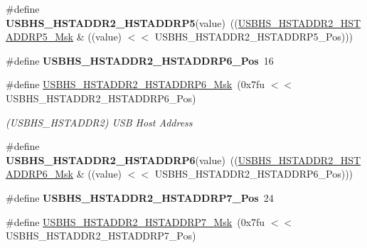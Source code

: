 \begin{DoxyCompactItemize}
\#define {\bfseries U\+S\+B\+H\+S\+\_\+\+H\+S\+T\+A\+D\+D\+R2\+\_\+\+H\+S\+T\+A\+D\+D\+R\+P5}(value)~((\mbox{\hyperlink{group__SAMV71__USBHS_ga640723a5595cb0b6570c020283459642}{U\+S\+B\+H\+S\+\_\+\+H\+S\+T\+A\+D\+D\+R2\+\_\+\+H\+S\+T\+A\+D\+D\+R\+P5\+\_\+\+Msk}} \& ((value) $<$$<$ U\+S\+B\+H\+S\+\_\+\+H\+S\+T\+A\+D\+D\+R2\+\_\+\+H\+S\+T\+A\+D\+D\+R\+P5\+\_\+\+Pos)))
\item 
\mbox{\label{group__SAMS70__USBHS_ga6278801ff91bfff0c8b5c5ff03386f86}} 
\#define {\bfseries U\+S\+B\+H\+S\+\_\+\+H\+S\+T\+A\+D\+D\+R2\+\_\+\+H\+S\+T\+A\+D\+D\+R\+P6\+\_\+\+Pos}~16
\item 
\mbox{\label{group__SAMS70__USBHS_gac3763c3bc84fc901d65ff13c5a16be24}} 
\#define \mbox{\hyperlink{group__SAMS70__USBHS_gac3763c3bc84fc901d65ff13c5a16be24}{U\+S\+B\+H\+S\+\_\+\+H\+S\+T\+A\+D\+D\+R2\+\_\+\+H\+S\+T\+A\+D\+D\+R\+P6\+\_\+\+Msk}}~(0x7fu $<$$<$ U\+S\+B\+H\+S\+\_\+\+H\+S\+T\+A\+D\+D\+R2\+\_\+\+H\+S\+T\+A\+D\+D\+R\+P6\+\_\+\+Pos)
\begin{DoxyCompactList}\small\item\em (U\+S\+B\+H\+S\+\_\+\+H\+S\+T\+A\+D\+D\+R2) U\+SB Host Address \end{DoxyCompactList}\item 
\mbox{\label{group__SAMS70__USBHS_ga01a1c6ff41592ecc6f4d489481924108}} 
\#define {\bfseries U\+S\+B\+H\+S\+\_\+\+H\+S\+T\+A\+D\+D\+R2\+\_\+\+H\+S\+T\+A\+D\+D\+R\+P6}(value)~((\mbox{\hyperlink{group__SAMV71__USBHS_gac3763c3bc84fc901d65ff13c5a16be24}{U\+S\+B\+H\+S\+\_\+\+H\+S\+T\+A\+D\+D\+R2\+\_\+\+H\+S\+T\+A\+D\+D\+R\+P6\+\_\+\+Msk}} \& ((value) $<$$<$ U\+S\+B\+H\+S\+\_\+\+H\+S\+T\+A\+D\+D\+R2\+\_\+\+H\+S\+T\+A\+D\+D\+R\+P6\+\_\+\+Pos)))
\item 
\mbox{\label{group__SAMS70__USBHS_gac6e50fa9a7f61b660b89fa26e6a2bf6c}} 
\#define {\bfseries U\+S\+B\+H\+S\+\_\+\+H\+S\+T\+A\+D\+D\+R2\+\_\+\+H\+S\+T\+A\+D\+D\+R\+P7\+\_\+\+Pos}~24
\item 
\mbox{\label{group__SAMS70__USBHS_ga3c0a731ad16bca0bce8fe5eb35af9e2f}} 
\#define \mbox{\hyperlink{group__SAMS70__USBHS_ga3c0a731ad16bca0bce8fe5eb35af9e2f}{U\+S\+B\+H\+S\+\_\+\+H\+S\+T\+A\+D\+D\+R2\+\_\+\+H\+S\+T\+A\+D\+D\+R\+P7\+\_\+\+Msk}}~(0x7fu $<$$<$ U\+S\+B\+H\+S\+\_\+\+H\+S\+T\+A\+D\+D\+R2\+\_\+\+H\+S\+T\+A\+D\+D\+R\+P7\+\_\+\+Pos)

\end{DoxyCompactItemize}
